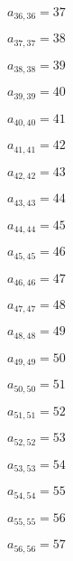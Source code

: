 \documentclass[a4paper,12pt]{article}
\begin{document}
$a _{ 36, 36 } = 37$

$a _{ 37, 37 } = 38$

$a _{ 38, 38 } = 39$

$a _{ 39, 39 } = 40$

$a _{ 40, 40 } = 41$

$a _{ 41, 41 } = 42$

$a _{ 42, 42 } = 43$

$a _{ 43, 43 } = 44$

$a _{ 44, 44 } = 45$

$a _{ 45, 45 } = 46$

$a _{ 46, 46 } = 47$

$a _{ 47, 47 } = 48$

$a _{ 48, 48 } = 49$

$a _{ 49, 49 } = 50$

$a _{ 50, 50 } = 51$

$a _{ 51, 51 } = 52$

$a _{ 52, 52 } = 53$

$a _{ 53, 53 } = 54$

$a _{ 54, 54 } = 55$

$a _{ 55, 55 } = 56$

$a _{ 56, 56 } = 57$
\end{document}
